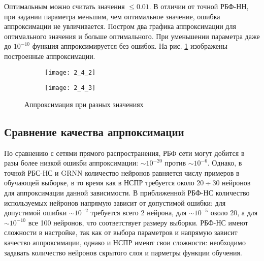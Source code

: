 Оптимальным можно считать значения  $\leq 0.01$. В отличии от точной РБФ-НН, при задании параметра  меньшим, чем оптимальное значение, ошибка аппроксимации не увличивается. Постром два графика аппроксимации для оптимального значения  и больше оптимального. При уменьшении параметра даже до $10^{-10}$ функция аппроксимируется без ошибок. На рис. \ref{fig:2_4_2} изображены построенные аппроксимации.
\begin{figure}[H]
\begin{center}
	\begin{subfigure}{0.49\textwidth}
		\texttt{[image: 2\_4\_2]}
		\caption{}
	\end{subfigure}
	\begin{subfigure}{0.49\textwidth}
		\texttt{[image: 2\_4\_3]}
		\caption{}
	\end{subfigure}
	\caption{Аппроксимация при разных значениях }
	\label{fig:2_4_2}
\end{center}
\end{figure}

\subsection{Сравнение качества апрпоксимации}


По сравнению с сетями прямого распространения, РБФ сети могут добится в разы более низкой ошикби аппроксимации: $\sim 10^{-20}$ против $\sim 10^{-6}$. Однако, в точной РБС-НС и GRNN количество нейронов равняется числу примеров в обучающей выборке, в то время как в НСПР требуется около $20 \div 30$ нейронов для аппроксимации данной зависимости. В приближенной РБФ-НС количество используемых нейронов напрямую зависит от допустимой ошибки: для допустимой ошибки $\sim 10^{-2}$ требуется всего 2 нейрона, для $\sim 10^{-5}$ около 20, а для $\sim 10^{-10}$ все 100 нейронов, что соответствует размеру выборки. РБФ-НС имеют сложности в настройке, так как от выбора параметров  и  напрямую зависит качество аппроксимации, однако и НСПР имеют свои сложности:  необходимо задавать количество нейронов скрытого слоя и парметры функции обучения.

